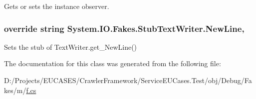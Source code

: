 Gets or sets the instance observer.

\hypertarget{class_system_1_1_i_o_1_1_fakes_1_1_stub_text_writer_a0ecaa25da7e3b9cb9c264c571a996381}{
\subsubsection[{New\-Line}]{\setlength{\rightskip}{0pt plus 5cm}override string System.\-I\-O.\-Fakes.\-Stub\-Text\-Writer.\-New\-Line\hspace{0.3cm}{\ttfamily [get]}, {\ttfamily [set]}}}\label{class_system_1_1_i_o_1_1_fakes_1_1_stub_text_writer_a0ecaa25da7e3b9cb9c264c571a996381}


Sets the stub of Text\-Writer.\-get\-\_\-\-New\-Line()



The documentation for this class was generated from the following file\-:\begin{DoxyCompactItemize}
\item 
D\-:/\-Projects/\-E\-U\-C\-A\-S\-E\-S/\-Crawler\-Framework/\-Service\-E\-U\-Cases.\-Test/obj/\-Debug/\-Fakes/m/\hyperlink{m_2f_8cs}{f.\-cs}\end{DoxyCompactItemize}
